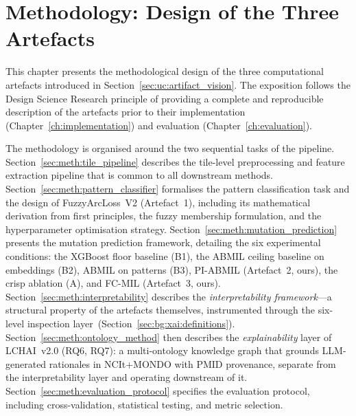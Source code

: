 
\chapter[Methodology]{Methodology: Design of the Three Artefacts}
\label{ch:methodology}

This chapter presents the methodological design of the three computational artefacts introduced in Section~\ref{sec:uc:artifact_vision}.
The exposition follows the Design Science Research principle of providing a complete and reproducible description of the artefacts prior to their implementation (Chapter~\ref{ch:implementation}) and evaluation (Chapter~\ref{ch:evaluation}).

The methodology is organised around the two sequential tasks of the pipeline.
Section~\ref{sec:meth:tile_pipeline} describes the tile-level preprocessing and feature extraction pipeline that is common to all downstream methods.
Section~\ref{sec:meth:pattern_classifier} formalises the pattern classification task and the design of FuzzyArcLoss~V2 (Artefact~1), including its mathematical derivation from first principles, the fuzzy membership formulation, and the hyperparameter optimisation strategy.
Section~\ref{sec:meth:mutation_prediction} presents the mutation prediction framework, detailing the six experimental conditions: the XGBoost floor baseline (B1), the ABMIL ceiling baseline on embeddings (B2), ABMIL on patterns (B3), PI-ABMIL (Artefact~2, ours), the crisp ablation (A), and FC-MIL (Artefact~3, ours).
Section~\ref{sec:meth:interpretability} describes the
\emph{interpretability framework}---a structural property of the
artefacts themselves, instrumented through the six-level inspection
layer~(Section~\ref{sec:bg:xai:definitions}).
Section~\ref{sec:meth:ontology_method} then describes the
\emph{explainability} layer of LCHAI~v2.0 (RQ6, RQ7): a
multi-ontology knowledge graph that grounds LLM-generated rationales
in NCIt+MONDO with PMID provenance, separate from
the interpretability layer and operating downstream of it.
Section~\ref{sec:meth:evaluation_protocol} specifies the evaluation protocol, including cross-validation, statistical testing, and metric selection.


